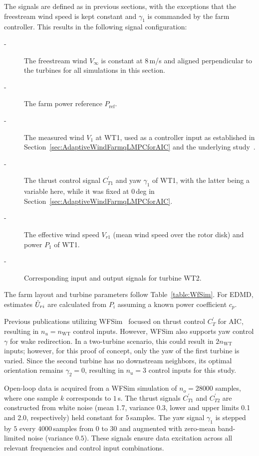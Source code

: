 The signals are defined as in previous sections, with the exceptions that the freestream wind speed is kept constant and $\gamma_1$ is commanded by the farm controller. This results in the following signal configuration:
\begin{description}
    \item[-] The freestream wind $V_\infty$ is constant at $8$\,m/s and aligned perpendicular to the turbines for all simulations in this section.
    \item[-] The farm power reference $P_{\text{ref}}$.
    \item[-] The measured wind $V_1$ at WT1, used as a controller input as established in Section~\ref{sec:AdaptiveWindFarmqLMPCforAIC} and the underlying study~\cite{dittmer2022data}.
    \item[-] The thrust control signal $C_{T1}^{\prime}$ and yaw $\gamma_1$ of WT1, with the latter being a variable here, while it was fixed at $0$\,deg in Section~\ref{sec:AdaptiveWindFarmqLMPCforAIC}.
    \item[-] The effective wind speed $V_{r1}$ (mean wind speed over the rotor disk) and power $P_1$ of WT1.
    \item[-] Corresponding input and output signals for turbine WT2.
\end{description}
The farm layout and turbine parameters follow Table~\ref{table:WfSim}. For EDMD, estimates $\Tilde{U}_{ri}$ are calculated from $P_i$ assuming a known power coefficient $c_p$.

Previous publications utilizing WFSim~\cite{boersma2017tutorial,doekemeijer2018online, sharan2022Koopman, dittmer2022data} focused on thrust control $C_T^{\prime}$ for AIC, resulting in $n_u = n_{\text{WT}}$ control inputs. However, WFSim also supports yaw control $\gamma$ for wake redirection. In a two-turbine scenario, this could result in $2n_{\text{WT}}$ inputs; however, for this proof of concept, only the yaw of the first turbine is varied. Since the second turbine has no downstream neighbors, its optimal orientation remains $\gamma_2 = 0$\textdegree{}, resulting in $n_u = 3$ control inputs for this study.

Open-loop data is acquired from a WFSim simulation of $n_o = 28000$ samples, where one sample $k$ corresponds to $1$\,s. The thrust signals $C_{T1}^{\prime}$ and $C_{T2}^{\prime}$ are constructed from white noise (mean 1.7, variance 0.3, lower and upper limits 0.1 and 2.0, respectively) held constant for $5$\,samples. The yaw signal $\gamma_1$ is stepped by $5$\textdegree{} every $4000$\,samples from $0$\textdegree{} to $30$\textdegree{} and augmented with zero-mean band-limited noise (variance $0.5$\textdegree{}). These signals ensure data excitation across all relevant frequencies and control input combinations.


